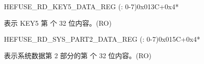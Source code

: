     \begin{register}{H}{EFUSE\_RD\_KEY5\_DATA\_REG (: 0-7)}{0x013C+0x4*}\label{regdesc:EFUSERDKEY5DATANREG}
    \regnewline%
    \begin{regdesc}\begin{reglist}
    \label{fielddesc:EFUSEKEY5DATAN}\item [EFUSE\_KEY5\_DATA\regindex{n}] 表示 KEY5 第  个 32 位内容。(RO)
    \end{reglist}\end{regdesc}
    \end{register}


    \begin{register}{H}{EFUSE\_RD\_SYS\_PART2\_DATA\_REG (: 0-7)}{0x015C+0x4*}\label{regdesc:EFUSERDSYSPART2DATANREG}
    \regnewline%
    \begin{regdesc}\begin{reglist}
    \label{fielddesc:EFUSESYSDATAPART2N}\item [EFUSE\_SYS\_DATA\_PART2\_\regindex{n}] 表示系统数据第 2 部分的第  个 32 位内容。(RO)
    \end{reglist}\end{regdesc}
    \end{register}


